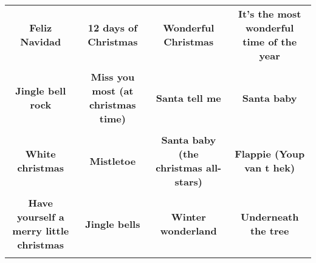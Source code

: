 \documentclass[12pt]{article} \usepackage{eso-pic, graphicx}
\newcommand{\background}[1]{%
\AddToShipoutPictureBG*{\texttt{[image: \#1]}}
}
\begin{document}
\tabcolsep=30.2pt \renewcommand{\arraystretch}{4.5}   \vspace*{4.3cm} \begin{center}  \begin{tabular}{c c c c}
\parbox{3cm}{\centering \textbf{Feliz Navidad}}& 
\parbox{3cm}{\centering \textbf{12 days of Christmas}}& 
\parbox{3cm}{\centering \textbf{Wonderful Christmas}}& 
\parbox{3cm}{\centering \textbf{It’s the most wonderful time of the year}}\\ \\ 
\parbox{3cm}{\centering \textbf{Jingle bell rock}}& 
\parbox{3cm}{\centering \textbf{Miss you most (at christmas time)}}& 
\parbox{3cm}{\centering \textbf{Santa tell me}}& 
\parbox{3cm}{\centering \textbf{Santa baby}}\\ \\ 
\parbox{3cm}{\centering \textbf{White christmas}}& 
\parbox{3cm}{\centering \textbf{Mistletoe}}& 
\parbox{3cm}{\centering \textbf{Santa baby (the christmas all-stars)}}& 
\parbox{3cm}{\centering \textbf{Flappie (Youp van t hek)}}\\ \\ 
\parbox{3cm}{\centering \textbf{Have yourself a merry little christmas}}& 
\parbox{3cm}{\centering \textbf{Jingle bells}}& 
\parbox{3cm}{\centering \textbf{Winter wonderland}}& 
\parbox{3cm}{\centering \textbf{Underneath the tree}}\\ \\ 
\end{tabular} \background{discobingo.pdf} \end{center} 
\end{document}
